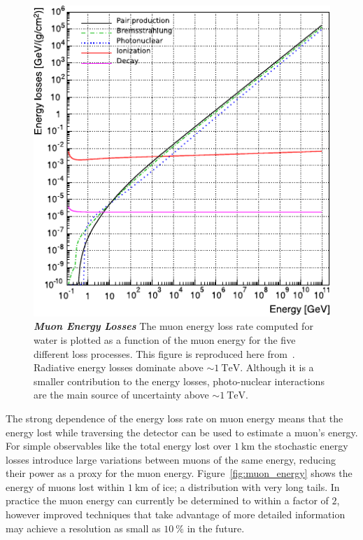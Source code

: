 \begin{figure}
	\centering
	\includegraphics[width=0.8\linewidth]{figures/energy_losses}
	\internallinenumbers
	\caption{\textbf{\textit{Muon Energy Losses}}
		The muon energy loss rate computed for water is plotted as a function of the muon energy for the five different loss processes.
		This figure is reproduced here from~\cite{Koehne:2013gpa}.
		Radiative energy losses dominate above $\sim\SI{1}\TeV$.
		Although it is a smaller contribution to the energy losses, photo-nuclear interactions are the main source of uncertainty above $\sim\SI{1}\TeV$.
	}\label{fig:energy_losses}
\end{figure}

The strong dependence of the energy loss rate on muon energy means that the energy lost while traversing the detector can be used to estimate a muon's energy.
For simple observables like the total energy lost over $\SI{1}\km$ the stochastic energy losses introduce large variations between muons of the same energy, reducing their power as a proxy for the muon energy.
Figure~\ref{fig:muon_energy} shows the energy of muons lost within $\SI{1}\km$ of ice; a distribution with very long tails.
In practice the muon energy can currently be determined to within a factor of $2$, however improved techniques that take advantage of more detailed information may achieve a resolution as small as $\SI{10}\percent$ in the future.

